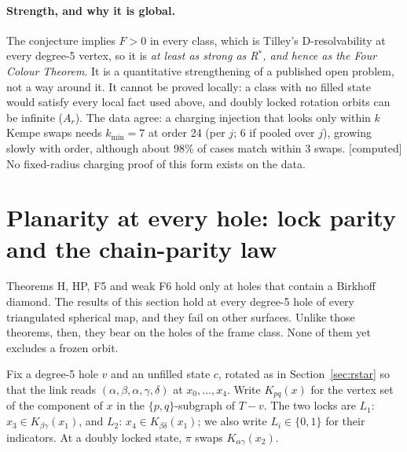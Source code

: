\documentclass[11pt]{article}
\newcommand{\lab}[1]{\textsf{[#1]}}
\begin{document}
\paragraph{Strength, and why it is global.} The conjecture implies $F>0$ in every class, which is Tilley's D-resolvability at every degree-5 vertex, so it is \emph{at least as strong as R$^\ast$, and hence as the Four Colour Theorem}. It is a quantitative strengthening of a published open problem, not a way around it. It cannot be proved locally: a class with no filled state would satisfy every local fact used above, and doubly locked rotation orbits can be infinite ($A_r$). The data agree: a charging injection that looks only within $k$ Kempe swaps needs $k_{\min}=7$ at order 24 (per $j$; 6 if pooled over $j$), growing slowly with order, although about 98\% of cases match within 3 swaps. \lab{computed} No fixed-radius charging proof of this form exists on the data.

\section{Planarity at every hole: lock parity and the chain-parity law}\label{sec:parity}
Theorems H, HP, F5 and weak F6 hold only at holes that contain a Birkhoff diamond. The results of this section hold at every degree-5 hole of every triangulated spherical map, and they fail on other surfaces. Unlike those theorems, then, they bear on the holes of the frame class. None of them yet excludes a frozen orbit.

Fix a degree-5 hole $v$ and an unfilled state $c$, rotated as in Section~\ref{sec:rstar} so that the link reads $(\alpha,\beta,\alpha,\gamma,\delta)$ at $x_0,\dots,x_4$. Write $K_{pq}(x)$ for the vertex set of the component of $x$ in the $\{p,q\}$-subgraph of $T-v$. The two locks are $L_1$: $x_3\in K_{\beta\gamma}(x_1)$, and $L_2$: $x_4\in K_{\beta\delta}(x_1)$; we also write $L_i\in\{0,1\}$ for their indicators. At a doubly locked state, $\pi$ swaps $K_{\alpha\gamma}(x_2)$.
\end{document}
